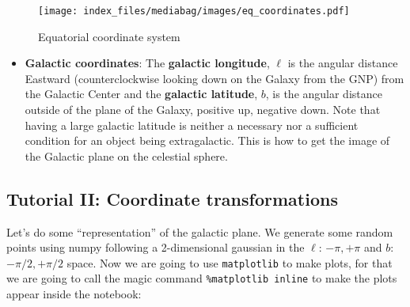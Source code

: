 \documentclass[
  letterpaper,
  DIV=11,
  numbers=noendperiod]{scrreprt}
\providecommand{\tightlist}{%
  \setlength{\itemsep}{0pt}\setlength{\parskip}{0pt}}\usepackage{longtable,booktabs,array}
\begin{document}
\begin{figure}[H]

{\centering \texttt{[image: index\_files/mediabag/images/eq\_coordinates.pdf]}

}

\caption{Equatorial coordinate system}

\end{figure}%

\begin{itemize}
\tightlist
\item
  \textbf{Galactic coordinates}: The \textbf{galactic longitude},
  \(\ell\) is the angular distance Eastward (counterclockwise looking
  down on the Galaxy from the GNP) from the Galactic Center and the
  \textbf{galactic latitude}, \(b\), is the angular distance outside of
  the plane of the Galaxy, positive up, negative down. Note that having
  a large galactic latitude is neither a necessary nor a sufficient
  condition for an object being extragalactic. This is how to get the
  image of the Galactic plane on the celestial sphere.
\end{itemize}

\subsection*{Tutorial II: Coordinate
transformations}\label{tutorial-ii-coordinate-transformations}

Let's do some ``representation'' of the galactic plane. We generate some
random points using numpy following a 2-dimensional gaussian in the
\(\ell\): \(-\pi, +\pi\) and \(b\):\(-\pi/2, +\pi/2\) space. Now we are
going to use \texttt{matplotlib} to make plots, for that we are going to
call the magic command \texttt{\%matplotlib\ inline} to make the plots
appear inside the notebook:
\end{document}
